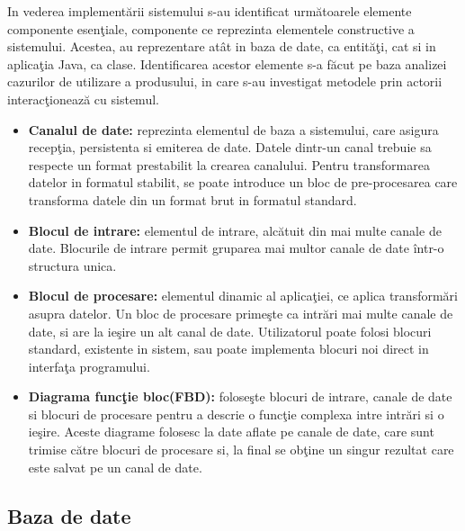 In vederea implementării sistemului s-au identificat următoarele elemente componente esenţiale, componente ce reprezinta elementele constructive a sistemului. Acestea, au reprezentare atât in baza de date, ca entităţi, cat si in aplicaţia Java, ca clase. Identificarea acestor elemente s-a făcut pe baza analizei cazurilor de utilizare a produsului, in care s-au investigat metodele prin actorii interacţionează cu sistemul.
\begin{itemize}
\label{list:entities}
\item \textbf{Canalul de date:} reprezinta elementul de baza a sistemului, care asigura recepţia, persistenta si emiterea de date. Datele dintr-un canal trebuie sa respecte un format prestabilit la crearea canalului. Pentru transformarea datelor in formatul stabilit, se poate introduce un bloc de pre-procesarea care transforma datele din un format brut in formatul standard.
\item \textbf{Blocul de intrare:} elementul de intrare, alcătuit din mai multe canale de date. Blocurile de intrare permit gruparea mai multor canale de date într-o structura unica.   
\item \textbf{Blocul de procesare:} elementul dinamic al aplicaţiei, ce aplica transformări asupra datelor. Un bloc de procesare primeşte ca intrări mai multe canale de date, si are la ieşire un alt canal de date. Utilizatorul poate folosi blocuri standard, existente in sistem, sau poate implementa blocuri noi direct in interfaţa programului.
\item \textbf{Diagrama funcţie bloc(FBD):}  foloseşte blocuri de intrare, canale de date si blocuri de procesare pentru a descrie o funcţie complexa intre intrări si o ieşire. Aceste diagrame folosesc la date aflate pe canale de date, care sunt trimise către blocuri de procesare si, la final se obţine un singur rezultat care este salvat pe un canal de date.
\end{itemize}

\subsection{Baza de date}

